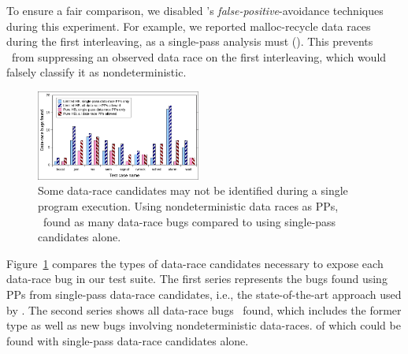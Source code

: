 To ensure a fair comparison, we disabled \landslide's {\em false-positive}-avoidance techniques during this experiment.
For example, we reported malloc-recycle data races during the first interleaving, as a single-pass analysis must
(\sect{\ref{sec:recycle}}).
This prevents \landslide~from suppressing an observed data race on the first interleaving,
which would falsely classify it as nondeterministic.

\begin{figure}[t]
	\includegraphics[width=0.48\textwidth]{nondets.pdf}
	\caption{Some data-race candidates may not be identified during a single program execution.
		Using nondeterministic data races as PPs,
		\quicksand~found  as many data-race bugs compared to using single-pass candidates alone.
	}
	\label{fig:dr-falsenegs}
\end{figure}
Figure~\ref{fig:dr-falsenegs} compares the types of data-race candidates necessary to expose each data-race bug in our test suite.
The first series represents the bugs found using PPs from single-pass data-race candidates,
i.e., the state-of-the-art approach used by \cite{racefuzzer,portend}.
The second series shows all data-race bugs \quicksand~found,
which includes the former type as well as new bugs involving nondeterministic data-races.
 of which could be found with single-pass data-race candidates alone.


